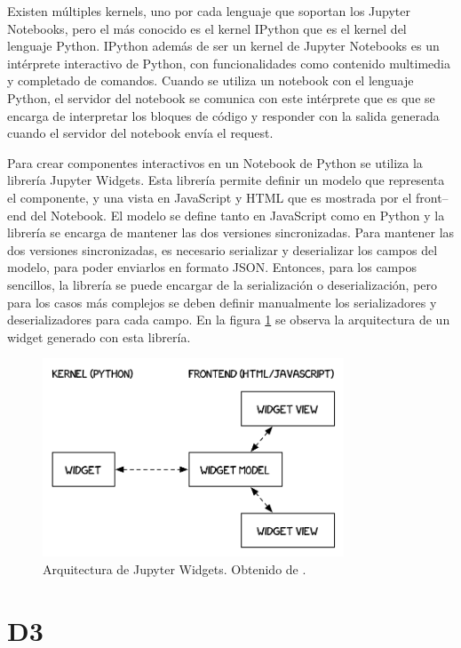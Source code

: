 Existen múltiples kernels, uno por cada lenguaje que soportan los Jupyter Notebooks, pero el más conocido es el kernel IPython que es el kernel del lenguaje Python. IPython además de ser un kernel de Jupyter Notebooks es un intérprete interactivo de Python, con funcionalidades como contenido multimedia y completado de comandos. Cuando se utiliza un notebook con el lenguaje Python, el servidor del notebook se comunica con este intérprete que es que se encarga de interpretar los bloques de código y responder con la salida generada cuando el servidor del notebook envía el request.

Para crear componentes interactivos en un Notebook de Python se utiliza la librería Jupyter Widgets. Esta librería permite definir un modelo que representa el componente, y una vista en JavaScript y HTML que es mostrada por el front--end del Notebook. El modelo se define tanto en JavaScript como en Python y la librería se encarga de mantener las dos versiones sincronizadas. Para mantener las dos versiones sincronizadas, es necesario serializar y deserializar los campos del modelo, para poder enviarlos en formato JSON. Entonces, para los campos sencillos, la librería se puede encargar de la serialización o deserialización, pero para los casos más complejos se deben definir manualmente los serializadores y deserializadores para cada campo. En la figura \ref{fig:widget_arq} se observa la arquitectura de un widget generado con esta librería.

\begin{figure}[h]
  \centering
  \includegraphics[width=0.8\textwidth]{imagenes/notebook/WidgetModelView}
  \caption[Arquitectura de Jupyter Widgets]{Arquitectura de Jupyter Widgets. Obtenido de \cite{arq-widget}.}
  \label{fig:widget_arq}
\end{figure}

\section{D3}

